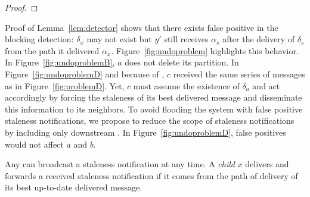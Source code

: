 \begin{proof}
\end{proof}

Proof of Lemma~\ref{lem:detector} shows that there exists false
positive in the blocking detection: $\delta_x$ may not exist but $y'$
still receives $\alpha_s$ after the delivery of $\delta_s$ from the
path it delivered $\alpha_x$. Figure~\ref{fig:undoproblem} highlights
this behavior. In Figure~\ref{fig:undoproblemB}, $a$ does not delete
its partition. In Figure~\ref{fig:undoproblemD} and because of \NAMEB,
$c$ received the same series of messages as in
Figure~\ref{fig:problemD}. Yet, $c$ must assume the existence of
$\delta_a$ and act accordingly by forcing the staleness of its best
delivered message and disseminate this information to its neighbors.
To avoid flooding the system with false positive staleness
notifications, we propose to reduce the scope of staleness
notifications by including only downstream \processes. In
Figure~\ref{fig:undoproblemD}, false positives would not affect $a$
and $b$.

\begin{definition} Any \emph{\process} can broadcast a
  staleness notification at any time. A \emph{child \process} $x$
  delivers and forwards a received staleness notification if it comes
  from the path of delivery of its best up-to-date delivered
  message. 
\end{definition}


